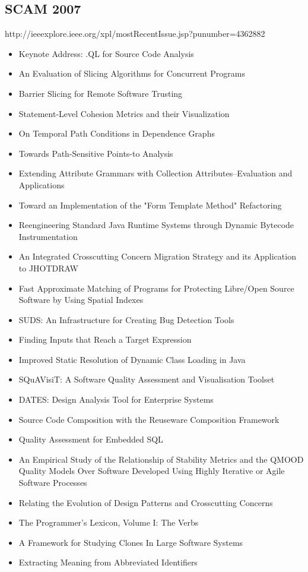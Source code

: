 \subsection{SCAM 2007}

http://ieeexplore.ieee.org/xpl/mostRecentIssue.jsp?punumber=4362882

{\small
\begin{itemize}[itemsep=-1ex]
  \item Keynote Address: .QL for Source Code Analysis
  \item An Evaluation of Slicing Algorithms for Concurrent Programs
  \item Barrier Slicing for Remote Software Trusting
  \item Statement-Level Cohesion Metrics and their Visualization
  \item On Temporal Path Conditions in Dependence Graphs
  \item Towards Path-Sensitive Points-to Analysis
  \item Extending Attribute Grammars with Collection Attributes--Evaluation and Applications
  \item Toward an Implementation of the "Form Template Method" Refactoring
  \item Reengineering Standard Java Runtime Systems through Dynamic Bytecode Instrumentation
  \item An Integrated Crosscutting Concern Migration Strategy and its Application to JHOTDRAW
  \item Fast Approximate Matching of Programs for Protecting Libre/Open Source Software by Using Spatial Indexes
  \item SUDS: An Infrastructure for Creating Bug Detection Tools
  \item Finding Inputs that Reach a Target Expression
  \item Improved Static Resolution of Dynamic Class Loading in Java
  \item SQuAVisiT: A Software Quality Assessment and Visualisation Toolset
  \item DATES: Design Analysis Tool for Enterprise Systems
  \item Source Code Composition with the Reuseware Composition Framework
  \item Quality Assessment for Embedded SQL
  \item An Empirical Study of the Relationship of Stability Metrics and the QMOOD Quality Models Over Software Developed Using Highly Iterative or Agile Software Processes
  \item Relating the Evolution of Design Patterns and Crosscutting Concerns
  \item The Programmer's Lexicon, Volume I: The Verbs
  \item A Framework for Studying Clones In Large Software Systems
  \item Extracting Meaning from Abbreviated Identifiers
\end{itemize}
}

